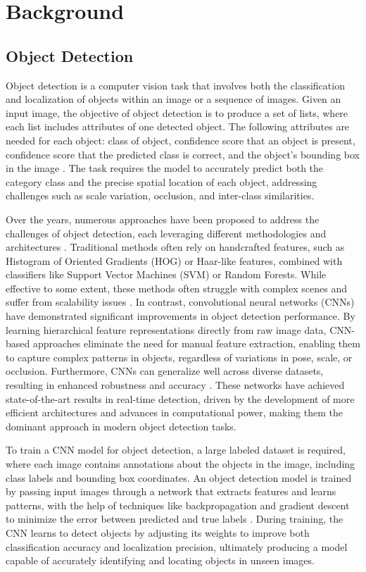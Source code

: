 \documentclass[journal,onecolumn,12pt]{IEEEtran}
\begin{document}
\section{Background}
\subsection{Object Detection}
\label{secmAP}
Object detection is a computer vision task that involves both the classification and localization of objects within an image or a sequence of images. Given an input image, the objective of object detection is to produce a set of lists, where each list includes attributes of one detected object. The following attributes are needed for each object: class of object, confidence score that an object is present, confidence score that the predicted class is correct, and the object's bounding box in the image \cite{8627998}. The task requires the model to accurately predict both the category class and the precise spatial location of each object, addressing challenges such as scale variation, occlusion, and inter-class similarities.

Over the years, numerous approaches have been proposed to address the challenges of object detection, each leveraging different methodologies and architectures \cite{zou2023object}. Traditional methods often rely on handcrafted features, such as Histogram of Oriented Gradients (HOG) or Haar-like features, combined with classifiers like Support Vector Machines (SVM) or Random Forests. While effective to some extent, these methods often struggle with complex scenes and suffer from scalability issues \cite{10099639}. In contrast, convolutional neural networks (CNNs) have demonstrated significant improvements in object detection performance. By learning hierarchical feature representations directly from raw image data, CNN-based approaches eliminate the need for manual feature extraction, enabling them to capture complex patterns in objects, regardless of variations in pose, scale, or occlusion. Furthermore, CNNs can generalize well across diverse datasets, resulting in enhanced robustness and accuracy \cite{cnnvstrad}. These networks have achieved state-of-the-art results in real-time detection, driven by the development of more efficient architectures and advances in computational power, making them the dominant approach in modern object detection tasks.

To train a CNN model for object detection, a large labeled dataset is required, where each image contains annotations about the objects in the image, including class labels and bounding box coordinates. An object detection model is trained by passing input images through a network that extracts features and learns patterns, with the help of techniques like backpropagation and gradient descent to minimize the error between predicted and true labels \cite{8825470}. During training, the CNN learns to detect objects by adjusting its weights to improve both classification accuracy and localization precision, ultimately producing a model capable of accurately identifying and locating objects in unseen images.
\end{document}
